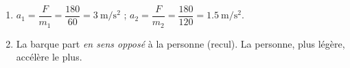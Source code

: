 \documentclass[11pt,a4paper]{article}
\begin{document}
\begin{corrige}
\begin{enumerate}[label=\alph*)]
  \item $a_1=\dfrac{F}{m_1}=\dfrac{180}{60}=\qty{3}{\metre\per\second\squared}$ ;
        $a_2=\dfrac{F}{m_2}=\dfrac{180}{120}=\qty{1,5}{\metre\per\second\squared}$.
  \item La barque part \emph{en sens opposé} à la personne (recul). La personne, plus légère, accélère le plus.
\end{enumerate}
\end{corrige}
\end{document}
